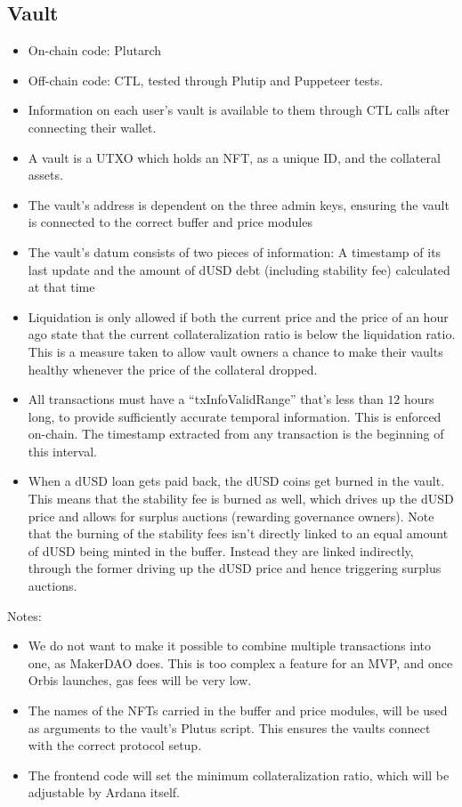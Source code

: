 \documentclass{article} %
\begin{document}
\subsection{Vault}

\begin{itemize}
  \item On-chain code: Plutarch
  \item Off-chain code: CTL, tested through Plutip and Puppeteer tests.
  \item Information on each user's vault is available to them through CTL
    calls after connecting their wallet.
  \item A vault is a UTXO which holds an NFT, as a unique ID, and the collateral
    assets.
  \item The vault's address is dependent on the three admin keys, ensuring the
    vault is connected to the correct buffer and price modules
  \item The vault's datum consists of two pieces of information: A timestamp of
    its last update and the amount of dUSD debt (including stability fee)
    calculated at that time
  \item Liquidation is only allowed if both the current price and the price of
    an hour ago state that the current collateralization ratio is below the
    liquidation ratio.
    This is a measure taken to allow vault owners a chance to make their vaults
    healthy whenever the price of the collateral dropped.
  \item All transactions must have a ``txInfoValidRange'' that's less than $12$
    hours long, to provide sufficiently accurate temporal information. This is
    enforced on-chain. The timestamp extracted from any transaction is the
    beginning of this interval.
  \item When a dUSD loan gets paid back, the dUSD coins get burned in the vault.
    This means that the stability fee is burned as well, which drives up the
    dUSD price and allows for surplus auctions (rewarding governance owners).
    Note that the burning of the stability fees isn't directly linked to an
    equal amount of dUSD being minted in the buffer.
    Instead they are linked indirectly, through the former driving up the dUSD
    price and hence triggering surplus auctions.
\end{itemize}

Notes:
\begin{itemize}
  \item We do not want to make it possible to combine multiple transactions into
    one, as MakerDAO does.
    This is too complex a feature for an MVP, and once Orbis launches, gas fees
    will be very low.
  \item The names of the NFTs carried in the buffer and price modules, will be
    used as arguments to the vault's Plutus script.
    This ensures the vaults connect with the correct protocol setup.
  \item The frontend code will set the minimum collateralization ratio, which
    will be adjustable by Ardana itself.
\end{itemize}
\end{document}
